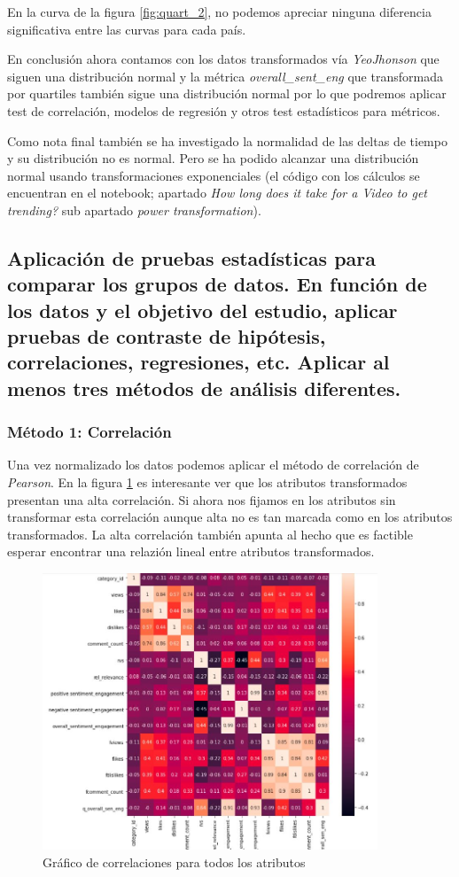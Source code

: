 \documentclass[a4paper,12pt]{article}
\begin{document}
En la curva de la figura \ref{fig:quart_2}, no podemos apreciar ninguna diferencia significativa entre las curvas para cada pa\'is.

En conclusi\'on ahora contamos con los datos transformados  v\'ia {\itshape Yeo\-Jhonson} que siguen una distribuci\'on normal y la m\'etrica {\itshape overall\_sent\_eng} que transformada por quartiles tambi\'en sigue una distribuci\'on normal por lo que podremos aplicar test de correlaci\'on, modelos de regresi\'on y otros test estad\'isticos para m\'etricos.

Como nota final tambi\'en se ha investigado la normalidad de las deltas de tiempo y su distribuci\'on no es normal. Pero se ha podido alcanzar una distribuci\'on normal usando transformaciones exponenciales (el c\'odigo con los c\'alculos se encuentran en el notebook; apartado {\itshape How long does it take for a Video to get trending?} sub apartado {\itshape power transformation}).

\subsection[item_pruebas]{Aplicaci\'on de pruebas estad\'isticas para comparar los grupos de datos. En funci\'on de los datos y el objetivo del estudio, aplicar pruebas de contraste de hip\'otesis, correlaciones, regresiones, etc. Aplicar al menos tres m\'etodos de an\'alisis diferentes.}


\subsubsection{M\'etodo 1: Correlaci\'on}

Una vez normalizado los datos podemos aplicar el m\'etodo de correlaci\'on de {\itshape Pearson}. En la figura \ref{fig:corrplot} es interesante ver que los atributos transformados presentan una alta correlaci\'on. Si ahora nos fijamos en los atributos sin transformar esta correlaci\'on aunque alta no es tan marcada como en los atributos transformados.  La alta correlaci\'on tambi\'en apunta al hecho que es factible esperar encontrar una relazi\'on lineal entre atributos transformados.
 
\begin{figure}[h!]
\centering
\includegraphics[width=10cm]{Correlation.JPG}
\caption{Gr\'afico de correlaciones para todos los atributos}
\label{fig:corrplot}
\end{figure}
\end{document}
